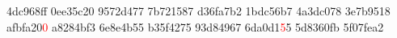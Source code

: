 4dc968ff 0ee35c20 9572d477 7b721587
d36fa7b2 1bdc56b7 4a3dc078 3e7b9518
afbfa20\textcolor{red}{0} a8284bf3 6e8e4b55 b35f4275
93d84967 6da0d1\textcolor{red}{5}5 5d8360fb 5f07fea2
